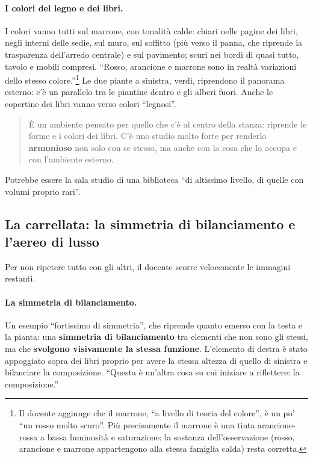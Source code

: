 \paragraph{I colori del legno e dei libri.} I colori vanno tutti sul marrone, con
tonalità calde: chiari nelle pagine dei libri, negli interni delle sedie, sul muro, sul
soffitto (più verso il panna, che riprende la trasparenza dell'arredo centrale) e sul
pavimento; scuri nei bordi di quasi tutto, tavolo e mobili compresi. ``Rosso, arancione e
marrone sono in realtà variazioni dello stesso colore.''\footnote{Il docente aggiunge che
il marrone, ``a livello di teoria del colore'', è un po' ``un rosso molto scuro''. Più
precisamente il marrone è una tinta arancione-rossa a bassa luminosità e saturazione: la
sostanza dell'osservazione (rosso, arancione e marrone appartengono alla stessa famiglia
calda) resta corretta.} Le due piante a sinistra, verdi, riprendono il panorama
esterno: c'è un parallelo tra le piantine dentro e gli alberi fuori. Anche le copertine
dei libri vanno verso colori ``legnosi''.
\begin{quote}
È un ambiente pensato per quello che c'è al centro della stanza: riprende le forme e i
colori dei libri. C'è uno studio molto forte per renderlo \textbf{armonioso} non solo
con se stesso, ma anche con la cosa che lo occupa e con l'ambiente esterno.
\end{quote}
Potrebbe essere la sala studio di una biblioteca ``di altissimo livello, di quelle con
volumi proprio rari''.

\subsection{La carrellata: la simmetria di bilanciamento e l'aereo di lusso}

Per non ripetere tutto con gli altri, il docente scorre velocemente le immagini restanti.

\paragraph{La simmetria di bilanciamento.} Un esempio ``fortissimo di simmetria'', che
riprende quanto emerso con la testa e la pianta: una \textbf{simmetria di bilanciamento}
tra elementi che non sono gli stessi, ma che \textbf{svolgono visivamente la stessa
funzione}. L'elemento di destra è stato appoggiato sopra dei libri proprio per avere la
stessa altezza di quello di sinistra e bilanciare la composizione. ``Questa è un'altra
cosa su cui iniziare a riflettere: la composizione.''

